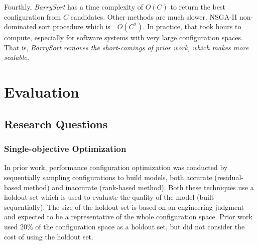 Fourthly, {\em BarrySort} has a time complexity of $O(C)$ to return the best configuration from $C$ candidates.
Other methods are much slower.
NSGA-II non-dominated sort procedure\cite{deb2002fast} which is~~$O(C^2)$. 
In practice, that took
 hours to compute, especially for  software systems with very large  configuration spaces.  
That is, {\em BarrySort}  \textit{removes the short-comings of   prior work, which makes \flash more scalable.}










\section{Evaluation}



\subsection{Research Questions}
\subsubsection{Single-objective Optimization}

In prior work, performance configuration optimization was conducted by sequentially sampling configurations to build models, both accurate (residual-based method) and inaccurate (rank-based method). 
Both these techniques use a holdout set which is used to evaluate the quality of the model (built sequentially). The size of the holdout set is based on an engineering judgment and expected to be a representative of the whole configuration space. Prior work~\cite{nair2017using} used 20\% of the configuration space as a holdout set, but did not consider the cost of using the holdout set.%

